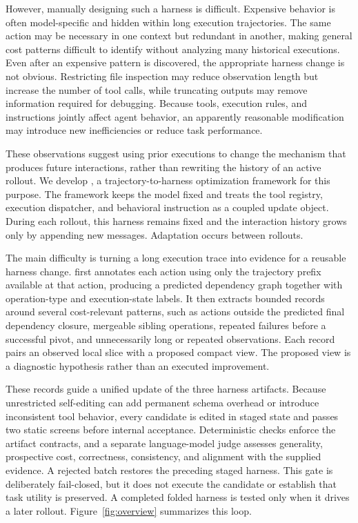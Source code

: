 However, manually designing such a harness is difficult. Expensive behavior is often model-specific and hidden within long execution trajectories. The same action may be necessary in one context but redundant in another, making general cost patterns difficult to identify without analyzing many historical executions. Even after an expensive pattern is discovered, the appropriate harness change is not obvious. Restricting file inspection may reduce observation length but increase the number of tool calls, while truncating outputs may remove information required for debugging. Because tools, execution rules, and instructions jointly affect agent behavior, an apparently reasonable modification may introduce new inefficiencies or reduce task performance.

These observations suggest using prior executions to change the mechanism that produces future interactions, rather than rewriting the history of an active rollout. We develop \sys{}, a trajectory-to-harness optimization framework for this purpose. The framework keeps the model fixed and treats the tool registry, execution dispatcher, and behavioral instruction as a coupled update object. During each rollout, this harness remains fixed and the interaction history grows only by appending new messages. Adaptation occurs between rollouts.

The main difficulty is turning a long execution trace into evidence for a reusable harness change. \sys{} first annotates each action using only the trajectory prefix available at that action, producing a predicted dependency graph together with operation-type and execution-state labels. It then extracts bounded records around several cost-relevant patterns, such as actions outside the predicted final dependency closure, mergeable sibling operations, repeated failures before a successful pivot, and unnecessarily long or repeated observations. Each record pairs an observed local slice with a proposed compact view. The proposed view is a diagnostic hypothesis rather than an executed improvement.

These records guide a unified update of the three harness artifacts. Because unrestricted self-editing can add permanent schema overhead or introduce inconsistent tool behavior, every candidate is edited in staged state and passes two static screens before internal acceptance. Deterministic checks enforce the artifact contracts, and a separate language-model judge assesses generality, prospective cost, correctness, consistency, and alignment with the supplied evidence. A rejected batch restores the preceding staged harness. This gate is deliberately fail-closed, but it does not execute the candidate or establish that task utility is preserved. A completed folded harness is tested only when it drives a later rollout. Figure~\ref{fig:overview} summarizes this loop.

